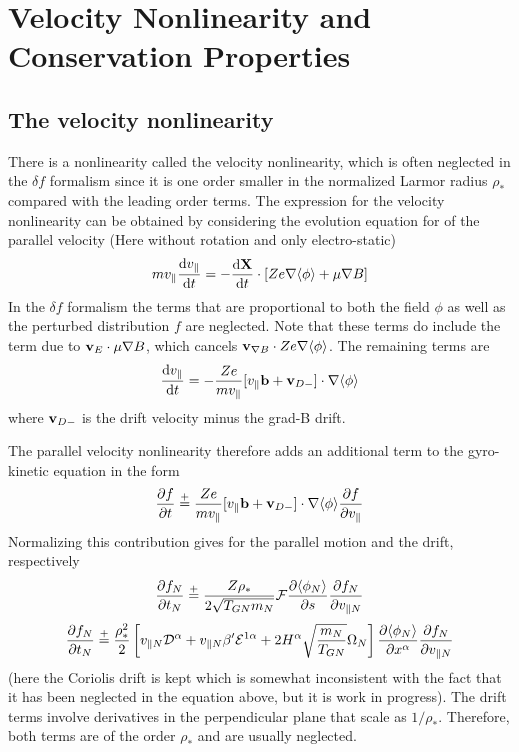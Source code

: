 \chapter{Velocity Nonlinearity and Conservation Properties}
\section{The velocity nonlinearity} 
\label{sec:velocity-nonlinearity} 

There is a nonlinearity called the velocity nonlinearity, which is often neglected in the $\delta f$ formalism since it is one order smaller 
in the normalized Larmor radius $\rho_*$ compared with the leading order terms. The
expression for the velocity nonlinearity can be obtained by considering the evolution equation for 
of the parallel velocity (Here without rotation and only electro-static) 
\begin{equation}
mv_\parallel \frac{\mathrm{d} v_\parallel}{\mathrm{d} t} = - \frac{\mathrm{d} \bf X}{\mathrm{d} t}\cdot \left [
Ze \nabla \langle \phi \rangle + \mu \nabla B \right ] 
\end{equation}
In the $\delta f$ formalism the terms that are proportional to both the field $\phi$ as well as the perturbed 
distribution $f$ are neglected. 
Note that these terms do include the term due to ${\bf v}_E \cdot \mu \nabla B$, which cancels 
${\bf v}_{\nabla B} \cdot Z e \nabla \langle \phi \rangle$. The remaining terms are 
\begin{equation}
 \frac{\mathrm{d} v_\parallel}{\mathrm{d} t} = - \frac{Ze }{ m v_\parallel} [ v_\parallel {\bf b} + {\bf v}_{D-} ] \cdot 
\nabla \langle \phi \rangle  
\end{equation}
where ${\bf v}_{D-}$ is the drift velocity minus the grad-B drift. 

The parallel velocity nonlinearity therefore adds an additional term to the gyro-kinetic equation in the 
form 
\begin{equation}
\frac{\partial f}{\partial  t} \overset{+}{=} \frac{Ze }{ m v_\parallel} [ v_\parallel {\bf b} + {\bf v}_{D-} ] \cdot 
\nabla \langle \phi \rangle  \frac{\partial  f }{\partial v_\parallel} 
\end{equation}
Normalizing this contribution gives for the parallel motion and the drift, respectively 
\begin{equation}
\frac{\partial f_N}{\partial t_N} \overset{+}{=} \frac{Z \rho_*}{2 \sqrt{T_{GN} m_N}}
 {\cal F} \frac{\partial  \langle \phi_N \rangle }{\partial s} 
\frac{\partial  f_N }{\partial v_{\parallel N}} 
\end{equation}
\begin{equation}
\frac{\partial  f_N}{\partial t_N} \overset{+}{=}  
\frac{\rho_*^2 }{ 2} \left [ v_{\parallel N} {\cal D}^\alpha + v_{\parallel N} \beta^\prime {\cal E}^{1 \alpha} + 
2 H^\alpha \sqrt{\frac{m_N }{ T_{GN}}} \Omega_N \right ] 
\frac{\partial  \langle \phi_N \rangle}{\partial  x^\alpha} \frac{\partial  f_N }{\partial v_{\parallel N}} 
\label{eq:parallel-velocity-nonlinearity-drift}
\end{equation}
(here the Coriolis drift is kept which is somewhat inconsistent with the fact that it has been neglected in the 
equation above, but it is work in progress). 
The drift terms involve derivatives in the perpendicular plane that scale as $1/\rho_*$. Therefore, both 
terms are of the order $\rho_*$ and are usually neglected. 

